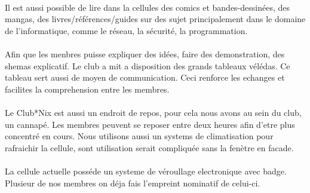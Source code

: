 \documentclass[11pt]{report}
\begin{document}
\paragraph{} Il est aussi possible de lire dans la cellules des comics et
bandes-dessinées, des mangas, des livres/références/guides sur des sujet
principalement dans le domaine de l'informatique, comme le réseau, la sécurité,
la programmation.

\paragraph{} Afin que les menbres puisse expliquer des idées, faire des demonstration, des shemas explicatif. Le club a mit a disposition des grands tableaux vélédas.
Ce tableau sert aussi de moyen de communication.
Ceci renforce les echanges et facilites la comprehension entre les membres.

\paragraph{} Le Club*Nix est aussi un endroit de repos, pour cela nous avons au sein du club, un cannapé. Les membres peuvent se reposer entre deux heures afin d'etre plus concentré en cours. Nous utilisons aussi un systems de climatisation pour rafraichir la cellule, sont utilisation serait compliquée sans la fenètre en facade.

\paragraph{} La cellule actuelle posséde un systeme de véroullage electronique avec badge. Plusieur de nos membres on déja fais l'empreint nominatif de celui-ci.
\end{document}
